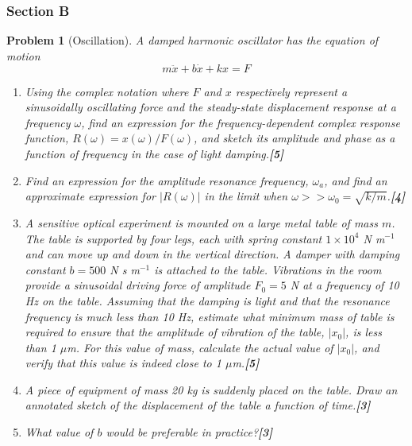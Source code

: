 \documentclass[a4paper]{article}
\theoremstyle{new}
\newtheorem{qns}{Problem}[subsection]
\begin{document}
\subsubsection{Section B}
\begin{qns}[Oscillation]
A damped harmonic oscillator has the equation of motion
$$m\ddot{x}+b\dot{x}+kx=F$$
\begin{enumerate}[label=(\roman*)]
\item Using the complex notation where $F$ and $x$ respectively represent a sinusoidally oscillating force and the steady-state displacement response at a frequency $\omega$, find an expression for the frequency-dependent complex response function, $R(\omega)=x(\omega)/F(\omega)$, and sketch its amplitude and phase as a function of frequency in the case of light damping.\hfill\textbf{[5]}
\item Find an expression for the amplitude resonance frequency, $\omega_a$, and find an approximate expression for $|R(\omega)|$ in the limit when $\omega>>\omega_0=\sqrt{k/m}$.\hfill\textbf{[4]}
\item A sensitive optical experiment is mounted on a large metal table of mass $m$. The table is supported by four legs, each with spring constant $1\times10^4$ N m$^{-1}$  and can move up and down in the vertical direction. A damper with damping constant $b = 500$ N s m$^{-1}$ is attached to the table. Vibrations in the room provide a sinusoidal driving force of amplitude $F_0 = 5$ N at a frequency of 10 Hz on the table. Assuming that the damping is light and that the resonance frequency is much less than 10 Hz, estimate what minimum mass of table is required to ensure that the amplitude of vibration of the table, $|x_0|$, is less than 1 $\mu$m. For this value of mass, calculate the actual value of $|x_0|$, and verify that this value is indeed close to 1 $\mu$m.\hfill\textbf{[5]}
\item A piece of equipment of mass 20 kg is suddenly placed on the table. Draw an annotated sketch of the displacement of the table a function of time.\hfill\textbf{[3]}
\item What value of $b$ would be preferable in practice?\hfill\textbf{[3]}
\end{enumerate}
\end{qns}
\end{document}

